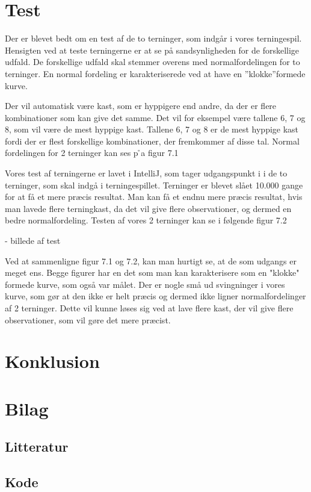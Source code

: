 \documentclass{article}
\begin{document}
\section{Test}
Der er blevet bedt om en test af de to terninger, som indgår i vores terningespil. Hensigten ved at teste terningerne er at se på sandsynligheden for de forskellige udfald. De forskellige udfald skal stemmer overens med normalfordelingen for to terninger. En normal fordeling er karakteriserede ved at have en ”klokke”formede kurve. 

Der vil automatisk være kast, som er hyppigere end andre, da der er flere kombinationer som kan give det samme. Det vil for eksempel være tallene  6, 7 og 8, som vil være de mest hyppige kast. Tallene 6, 7 og 8 er de mest hyppige kast fordi der er flest forskellige kombinationer, der fremkommer af disse tal. 
Normal fordelingen for 2 terninger kan ses p ̊a figur 7.1




\item
Vores test af terningerne er lavet i IntelliJ, som tager udgangspunkt i i de to terninger, som skal indgå i terningespillet. Terninger er blevet slået 10.000 gange for at få et mere præcis resultat. Man kan få et endnu mere præcis resultat, hvis man lavede flere terningkast, da det vil give flere observationer, og dermed en bedre normalfordeling.
Testen af vores 2 terninger kan se i følgende figur 7.2

- billede af test


\item
Ved at sammenligne figur 7.1 og 7.2, kan man hurtigt se, at de som udgangs er meget ens. Begge figurer har en det som man kan karakterisere som en "klokke" formede kurve, som også var målet. Der er nogle små ud svingninger i vores kurve, som gør at den ikke er helt præcis og dermed ikke ligner normalfordelinger af 2 terninger. Dette vil kunne løses sig ved at lave flere kast, der vil give flere observationer, som vil gøre det mere præcist. 


\section{Konklusion}

\section{Bilag}
\subsection{Litteratur}
\subsection{Kode}
\end{document}
